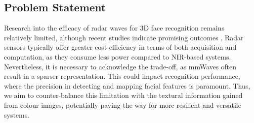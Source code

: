 \documentclass{mpaper}
\begin{document}
\vspace{-2.1pt}
\subsection{Problem Statement}
Research into the efficacy of radar waves for 3D face recognition remains relatively limited, although recent studies indicate promising outcomes \cite{hof2020face, lim2020dnn, kim2020face, pho2021radar, challa2021face}. Radar sensors typically offer greater cost efficiency in terms of both acquisition and computation, as they consume less power compared to NIR-based systems. Nevertheless, it is necessary to acknowledge the trade-off, as mmWaves often result in a sparser representation. This could impact recognition performance, where the precision in detecting and mapping facial features is paramount. Thus, we aim to counter-balance this limitation with the textural information gained from colour images, potentially paving the way for more resilient and versatile systems.
\end{document}
